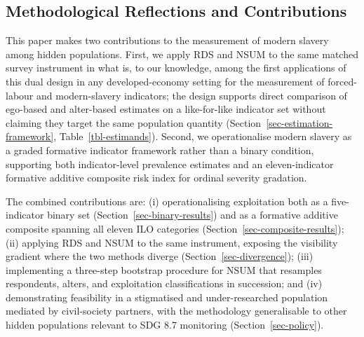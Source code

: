 \documentclass[
  12pt,
  letterpaper,
  DIV=11,
  numbers=noendperiod]{scrartcl}
\begin{document}
\subsection{Methodological Reflections and
Contributions}\label{sec-contributions}

This paper makes two contributions to the measurement of modern slavery
among hidden populations. First, we apply RDS and NSUM to the same
matched survey instrument in what is, to our knowledge, among the first
applications of this dual design in any developed-economy setting for
the measurement of forced-labour and modern-slavery indicators; the
design supports direct comparison of ego-based and alter-based estimates
on a like-for-like indicator set without claiming they target the same
population quantity (Section~\ref{sec-estimation-framework},
Table~\ref{tbl-estimands}). Second, we operationalise modern slavery as
a graded formative indicator framework rather than a binary condition,
supporting both indicator-level prevalence estimates and an
eleven-indicator formative additive composite risk index for ordinal
severity gradation.

The combined contributions are: (i) operationalising exploitation both
as a five-indicator binary set (Section~\ref{sec-binary-results}) and as
a formative additive composite spanning all eleven ILO categories
(Section~\ref{sec-composite-results}); (ii) applying RDS and NSUM to the
same instrument, exposing the visibility gradient where the two methods
diverge (Section~\ref{sec-divergence}); (iii) implementing a three-step
bootstrap procedure for NSUM that resamples respondents, alters, and
exploitation classifications in succession; and (iv) demonstrating
feasibility in a stigmatised and under-researched population mediated by
civil-society partners, with the methodology generalisable to other
hidden populations relevant to SDG 8.7 monitoring
(Section~\ref{sec-policy}).
\end{document}
